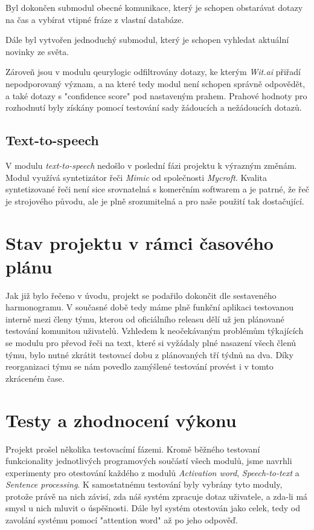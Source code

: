\documentclass[12pt,a4paper]{article}
\begin{document}
Byl dokončen submodul obecné komunikace, který je schopen obstarávat dotazy na čas a vybírat vtipné fráze z vlastní databáze.

Dále byl vytvořen jednoduchý submodul, který je schopen vyhledat aktuální novinky ze světa.

Zároveň jsou v modulu qeurylogic odfiltrovány dotazy, ke kterým \textit{Wit.ai} přiřadí nepodporovaný význam, a na které tedy  modul není schopen správně odpovědět, a také dotazy s "confidence score" pod nastaveným prahem. Prahové hodnoty pro rozhodnutí byly získány pomocí testování sady žádoucích a nežádoucích dotazů.

\subsection{Text-to-speech}
V modulu \textit{text-to-speech} nedošlo v poslední fázi projektu k výrazným změnám. Modul využívá syntetizátor řeči \textit{Mimic} od společnosti \textit{Mycroft}. 
Kvalita syntetizované řeči není sice srovnatelná s komerčním softwarem a je patrné, že řeč je strojového původu, ale je plně srozumitelná a pro naše použití tak dostačující.


\section{Stav projektu v rámci časového plánu}
Jak již bylo řečeno v úvodu, projekt se podařilo dokončit dle sestaveného harmonogramu. V současné době tedy máme plně funkční aplikaci testovanou interně mezi členy týmu, kterou od oficiálního releasu dělí už jen plánované testování komunitou uživatelů. Vzhledem k neočekávaným problémům týkajících se modulu pro převod řeči na text, které si vyžádaly plné nasazení všech členů týmu, bylo nutné zkrátit testovací dobu z plánovaných tří týdnů na dva. Díky reorganizaci týmu se nám povedlo zamýšlené testování provést i v tomto zkráceném čase.

\section{Testy a zhodnocení výkonu}
Projekt prošel několika testovacímí fázemi. Kromě běžného testovaní funkcionality jednotlivých programových součástí všech modulů, jsme navrhli experimenty pro otestování každého z modulů \textit{Activation word}, \textit{Speech-to-text} a \textit{Sentence processing}. K samostatnému testování byly vybrány tyto moduly, protože právě na nich závisí, zda náš systém zpracuje dotaz uživatele, a zda-li má smysl u nich mluvit o úspěšnosti. Dále byl systém otestován jako celek, tedy od zavolání systému pomocí "attention word" až po jeho odpověď.
\end{document}
